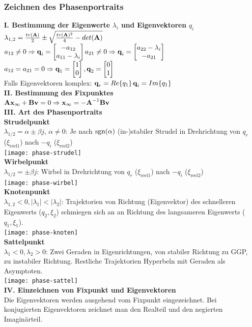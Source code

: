 \documentclass[fs, footer]{latex4ei}
\begin{document}
\begin{multicols*}{4}
    \subsubsection{Zeichnen des Phasenportraits}
    \textbf{I. Bestimmung der Eigenwerte $\lambda_i$ und Eigenvektoren $q_i$}\\
    $\lambda_{1,2} = \frac{tr(\textbf{A})}{2} \pm \sqrt{\frac{tr(\textbf{A})^2}{4}-det(\textbf{A})}$\\
    $a_{12} \neq 0 \Rightarrow \textbf{q}_i = \begin{bmatrix} -a_{12}\\a_{11}-\lambda_i \end{bmatrix}$\quad $a_{21} \neq 0 \Rightarrow \textbf{q}_i = \begin{bmatrix} a_{22}-\lambda_i\\-a_{21} \end{bmatrix}$\quad$a_{12} = a_{21} = 0 \Rightarrow \textbf{q}_1 = \begin{bmatrix} 1\\0 \end{bmatrix}, \textbf{q}_2 = \begin{bmatrix} 0\\1 \end{bmatrix}$\\
    Falls Eigenvektoren komplex: $\textbf{q}_r = Re\{q_1\}$\qquad$\textbf{q}_i = Im\{q_1\}$\\
    \textbf{II. Bestimmung des Fixpunktes}\\
    $\textbf{A}\textbf{x}_\infty + \textbf{B}\textbf{v} = 0 \Rightarrow \textbf{x}_\infty = -\textbf{A}^{-1} \textbf{B}\textbf{v}$\\
    \textbf{III. Art des Phasenportraits}\\
    \textbf{Strudelpunkt}\\
    $\lambda_{1/2} = \alpha \pm \beta j$, $\alpha \neq 0$: Je nach $\operatorname{sgn}(\alpha)$ (in-)stabiler Strudel in Drehrichtung von $q_r$ ($\xi_{\text{reel}1}$) nach $-q_i$ ($\xi_{\text{reel}2}$)\\
    \texttt{[image: phase-strudel]}\\
    \textbf{Wirbelpunkt}\\
    $\lambda_{1/2} = \pm \beta j$: Wirbel in Drehrichtung von $q_r$ ($\xi_{\text{reel}1}$) nach $-q_i$ ($\xi_{\text{reel}2}$)\\
    \texttt{[image: phase-wirbel]}\\
    \textbf{Knotenpunkt}\\
    $\lambda_{1,2} < 0, |\lambda_1| < |\lambda_2|$: Trajektorien von Richtung (Eigenvektor) des schnelleren Eigenwerts ($q_2, \xi_2$) schmiegen sich an an Richtung des langsameren Eigenwerts ($q_1, \xi_1$).\\
    \texttt{[image: phase-knoten]}\\
    \textbf{Sattelpunkt}\\
    $\lambda_1 < 0, \lambda_2 > 0$: Zwei Geraden in Eigenrichtungen, von stabiler Richtung zu GGP, zu instabiler Richtung. Restliche Trajektorien Hyperbeln mit Geraden als Asymptoten.\\
    \texttt{[image: phase-sattel]}\\
    \textbf{IV. Einzeichnen von Fixpunkt und Eigenvektoren}\\
    Die Eigenvektoren werden ausgehend vom Fixpunkt eingezeichnet. Bei konjugierten Eigenvektoren zeichnet man den Realteil und den negierten Imaginärteil.\\

\end{multicols*}
\end{document}
